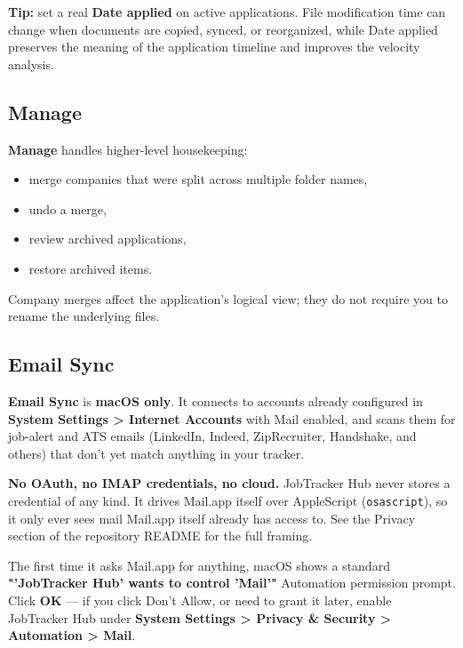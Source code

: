 \documentclass[11pt]{article}
\newcommand{\app}[1]{\textbf{#1}}
\begin{document}
\begin{infobox}
\textbf{Tip:} set a real \textbf{Date applied} on active applications. File modification time can change when documents are copied, synced, or reorganized, while Date applied preserves the meaning of the application timeline and improves the velocity analysis.
\end{infobox}

\subsection{Manage}

\app{Manage} handles higher-level housekeeping:

\begin{itemize}
  \item merge companies that were split across multiple folder names,
  \item undo a merge,
  \item review archived applications,
  \item restore archived items.
\end{itemize}

Company merges affect the application's logical view; they do not require you to rename the underlying files.

\subsection{Email Sync}\label{sec:email-sync}

\app{Email Sync} is \textbf{macOS only}. It connects to accounts already configured in \textbf{System Settings \textgreater{} Internet Accounts} with Mail enabled, and scans them for job-alert and ATS emails (LinkedIn, Indeed, ZipRecruiter, Handshake, and others) that don't yet match anything in your tracker.

\begin{infobox}
\textbf{No OAuth, no IMAP credentials, no cloud.} JobTracker Hub never stores a credential of any kind. It drives Mail.app itself over AppleScript (\texttt{osascript}), so it only ever sees mail Mail.app itself already has access to. See the Privacy section of the repository README for the full framing.
\end{infobox}

The first time it asks Mail.app for anything, macOS shows a standard \textbf{"'JobTracker Hub' wants to control 'Mail'"} Automation permission prompt. Click \textbf{OK} — if you click Don't Allow, or need to grant it later, enable JobTracker Hub under \textbf{System Settings \textgreater{} Privacy \& Security \textgreater{} Automation \textgreater{} Mail}.
\end{document}
